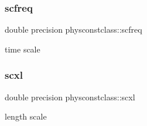 \subsubsection{\texorpdfstring{scfreq}{scfreq}}
{\footnotesize\ttfamily double precision physconstclass\+::scfreq}



time scale 

\mbox{\label{namespacephysconstclass_af2c99b666d1986d824837a37dd85cd50}} 
\subsubsection{\texorpdfstring{scxl}{scxl}}
{\footnotesize\ttfamily double precision physconstclass\+::scxl}



length scale 

